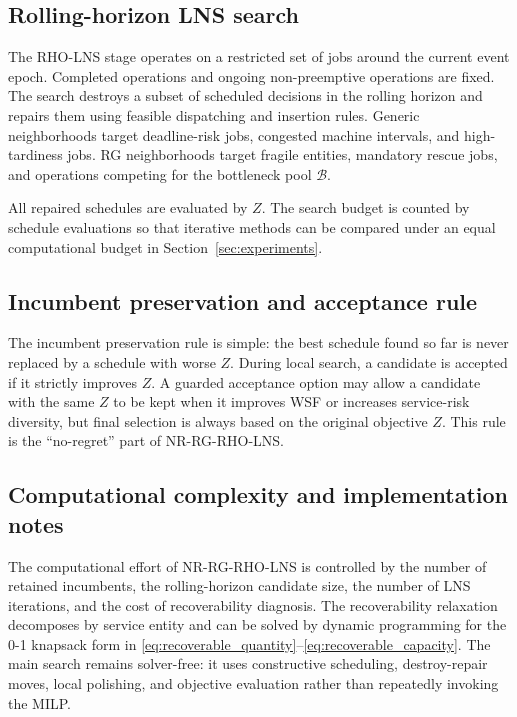 \documentclass[a4paper,fleqn]{cas-sc}
\begin{document}
\subsection{Rolling-horizon LNS search}
\label{sec:rho_lns_search}

The RHO-LNS stage operates on a restricted set of jobs around the current event epoch. Completed operations and ongoing non-preemptive operations are fixed. The search destroys a subset of scheduled decisions in the rolling horizon and repairs them using feasible dispatching and insertion rules. Generic neighborhoods target deadline-risk jobs, congested machine intervals, and high-tardiness jobs. RG neighborhoods target fragile entities, mandatory rescue jobs, and operations competing for the bottleneck pool \(\mathcal B\).

All repaired schedules are evaluated by \(Z\). The search budget is counted by schedule evaluations so that iterative methods can be compared under an equal computational budget in Section~\ref{sec:experiments}.

\subsection{Incumbent preservation and acceptance rule}
\label{sec:acceptance_rule}

The incumbent preservation rule is simple: the best schedule found so far is never replaced by a schedule with worse \(Z\). During local search, a candidate is accepted if it strictly improves \(Z\). A guarded acceptance option may allow a candidate with the same \(Z\) to be kept when it improves WSF or increases service-risk diversity, but final selection is always based on the original objective \(Z\). This rule is the ``no-regret'' part of NR-RG-RHO-LNS.

\subsection{Computational complexity and implementation notes}
\label{sec:algorithm_complexity}

The computational effort of NR-RG-RHO-LNS is controlled by the number of retained incumbents, the rolling-horizon candidate size, the number of LNS iterations, and the cost of recoverability diagnosis. The recoverability relaxation decomposes by service entity and can be solved by dynamic programming for the 0-1 knapsack form in \eqref{eq:recoverable_quantity}--\eqref{eq:recoverable_capacity}. The main search remains solver-free: it uses constructive scheduling, destroy-repair moves, local polishing, and objective evaluation rather than repeatedly invoking the MILP.
\end{document}
